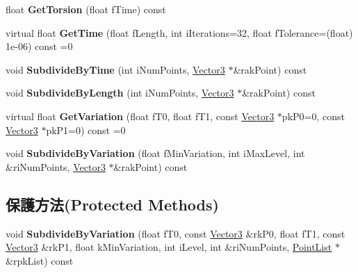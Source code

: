 \begin{DoxyCompactItemize}
\item 
float {\bfseries Get\+Torsion} (float f\+Time) const \hypertarget{class_magnum_1_1_curve3_a5b2e48e27a0547d9b3d1f6826cb57f1e}{}\label{class_magnum_1_1_curve3_a5b2e48e27a0547d9b3d1f6826cb57f1e}

\item 
virtual float {\bfseries Get\+Time} (float f\+Length, int i\+Iterations=32, float f\+Tolerance=(float) 1e-\/06) const  =0\hypertarget{class_magnum_1_1_curve3_a2e66ccb3a1b30dc6e0a2282865868ab3}{}\label{class_magnum_1_1_curve3_a2e66ccb3a1b30dc6e0a2282865868ab3}

\item 
void {\bfseries Subdivide\+By\+Time} (int i\+Num\+Points, \hyperlink{class_magnum_1_1_vector3}{Vector3} $\ast$\&rak\+Point) const \hypertarget{class_magnum_1_1_curve3_a0c59b1adbc68ec4fb0cfb8053e1859fe}{}\label{class_magnum_1_1_curve3_a0c59b1adbc68ec4fb0cfb8053e1859fe}

\item 
void {\bfseries Subdivide\+By\+Length} (int i\+Num\+Points, \hyperlink{class_magnum_1_1_vector3}{Vector3} $\ast$\&rak\+Point) const \hypertarget{class_magnum_1_1_curve3_adda30cfb054b33173517e2692382de0e}{}\label{class_magnum_1_1_curve3_adda30cfb054b33173517e2692382de0e}

\item 
virtual float {\bfseries Get\+Variation} (float f\+T0, float f\+T1, const \hyperlink{class_magnum_1_1_vector3}{Vector3} $\ast$pk\+P0=0, const \hyperlink{class_magnum_1_1_vector3}{Vector3} $\ast$pk\+P1=0) const  =0\hypertarget{class_magnum_1_1_curve3_a5ca419e625d43f9cec9324183adaffb2}{}\label{class_magnum_1_1_curve3_a5ca419e625d43f9cec9324183adaffb2}

\item 
void {\bfseries Subdivide\+By\+Variation} (float f\+Min\+Variation, int i\+Max\+Level, int \&ri\+Num\+Points, \hyperlink{class_magnum_1_1_vector3}{Vector3} $\ast$\&rak\+Point) const \hypertarget{class_magnum_1_1_curve3_a901236ae071e5a0a2a3b8e656c47cb31}{}\label{class_magnum_1_1_curve3_a901236ae071e5a0a2a3b8e656c47cb31}

\end{DoxyCompactItemize}
\subsection*{保護方法(Protected Methods)}
\begin{DoxyCompactItemize}
\item 
void {\bfseries Subdivide\+By\+Variation} (float f\+T0, const \hyperlink{class_magnum_1_1_vector3}{Vector3} \&rk\+P0, float f\+T1, const \hyperlink{class_magnum_1_1_vector3}{Vector3} \&rk\+P1, float k\+Min\+Variation, int i\+Level, int \&ri\+Num\+Points, \hyperlink{class_magnum_1_1_curve3_1_1_point_list}{Point\+List} $\ast$\&rpk\+List) const \hypertarget{class_magnum_1_1_curve3_a2a8894e5805603453ae137947a9ccc6f}{}\label{class_magnum_1_1_curve3_a2a8894e5805603453ae137947a9ccc6f}

\end{DoxyCompactItemize}
